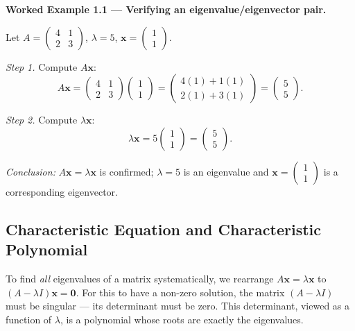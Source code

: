\documentclass[12pt,a4paper]{article}
\begin{document}
\textbf{Worked Example 1.1 --- Verifying an eigenvalue/eigenvector pair.}

Let $A = \begin{pmatrix} 4 & 1 \\ 2 & 3 \end{pmatrix}$, $\lambda = 5$, $\mathbf{x} = \begin{pmatrix} 1 \\ 1 \end{pmatrix}$.

\textit{Step 1.} Compute $A\mathbf{x}$:
\[
  A\mathbf{x} = \begin{pmatrix} 4 & 1 \\ 2 & 3 \end{pmatrix}\begin{pmatrix} 1 \\ 1 \end{pmatrix}
  = \begin{pmatrix} 4(1)+1(1) \\ 2(1)+3(1) \end{pmatrix}
  = \begin{pmatrix} 5 \\ 5 \end{pmatrix}.
\]

\textit{Step 2.} Compute $\lambda\mathbf{x}$:
\[
  \lambda\mathbf{x} = 5\begin{pmatrix} 1 \\ 1 \end{pmatrix} = \begin{pmatrix} 5 \\ 5 \end{pmatrix}.
\]

\textit{Conclusion:} $A\mathbf{x} = \lambda\mathbf{x}$ is confirmed; $\lambda = 5$ is an eigenvalue
and $\mathbf{x} = \begin{pmatrix}1\\1\end{pmatrix}$ is a corresponding eigenvector.

\subsection{Characteristic Equation and Characteristic Polynomial}

To find \emph{all} eigenvalues of a matrix systematically, we rearrange $A\mathbf{x} = \lambda\mathbf{x}$
to $(A - \lambda I)\mathbf{x} = \mathbf{0}$. For this to have a non-zero solution, the matrix
$(A - \lambda I)$ must be singular --- its determinant must be zero.
This determinant, viewed as a function of $\lambda$, is a polynomial whose roots are exactly the eigenvalues.
\end{document}
